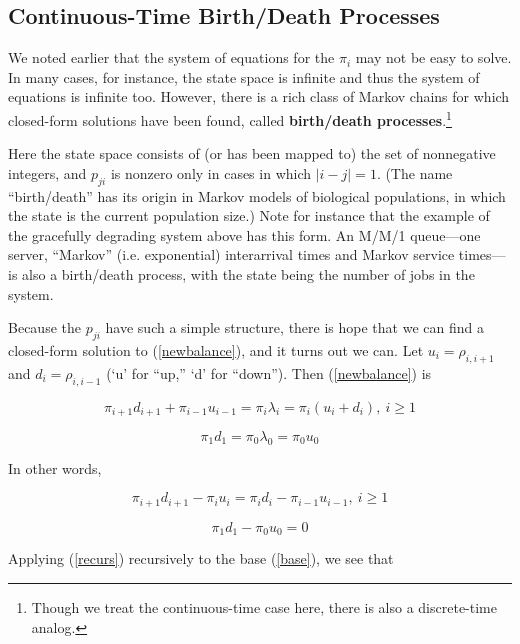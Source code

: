 \subsection{Continuous-Time Birth/Death Processes}

We noted earlier that the system of equations for the $\pi_i$ may not be
easy to solve. In many cases, for instance, the state space is infinite
and thus the system of equations is infinite too. However, there is a
rich class of Markov chains for which closed-form solutions have been
found, called \textbf{birth/death processes}.\footnote{Though we treat
the continuous-time case here, there is also a discrete-time analog.} 

Here the state space consists of (or has been mapped to) the
set of nonnegative integers, and $p_{ji}$ is nonzero only in cases in
which $|i-j| = 1$. (The name ``birth/death'' has its origin in Markov
models of biological populations, in which the state is the current
population size.) Note for instance that the example of the gracefully
degrading system above has this form. An M/M/1 queue---one server,
``Markov'' (i.e.  exponential) interarrival times and Markov service
times---is also a birth/death process, with the state being the number
of jobs in the system.

Because the $p_{ji}$ have such a simple structure, there is hope that
we can find a closed-form solution to (\ref{newbalance}), and it turns
out we can.  Let $u_i = \rho_{i,i+1}$ and $d_i = \rho_{i,i-1}$ (`u' for
``up,'' `d' for ``down'').  Then (\ref{newbalance}) is

\begin{equation}
\pi_{i+1} d_{i+1} + \pi_{i-1} u_{i-1} = \pi_i \lambda_i 
= \pi_i (u_i+d_i), ~ i \geq 1
\end{equation}

\begin{equation}
\pi_1 d_1 = \pi_0 \lambda_0 = \pi_0 u_0
\end{equation}

In other words,

\begin{equation}
\label{recurs}
\pi_{i+1} d_{i+1} - \pi_i u_i = \pi_i d_i - \pi_{i-1} u_{i-1}, ~ i \geq 1
\end{equation}

\begin{equation}
\label{base}
\pi_1 d_1 - \pi_0 u_0 = 0
\end{equation}

Applying (\ref{recurs}) recursively to the base (\ref{base}), we see
that

